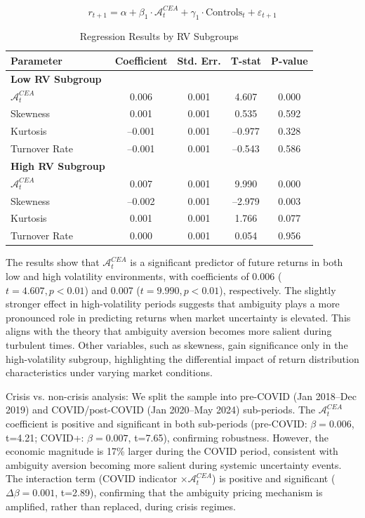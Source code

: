 \documentclass[preprint,12pt,authoryear]{elsarticle}
\renewcommand{\textcolor}[2]{\begingroup\color{#1}#2\endgroup}
\begin{document}
\begin{equation}
r_{t+1} = \alpha + \beta_1 \cdot \mathcal{A}^{CEA}_t + \gamma_1 \cdot \mathrm{Controls}_t + \varepsilon_{t+1}
\end{equation}

\begin{table}[h!]
\centering
\caption{Regression Results by RV Subgroups}
\label{tab:rv_subgroup_results}
\begin{tabularx}{\textwidth}{Xcccc}
\toprule
\textbf{Parameter} & \textbf{Coefficient} & \textbf{Std. Err.} & \textbf{T-stat} & \textbf{P-value} \\
\midrule
\textbf{Low RV Subgroup} & & & & \\
\(\mathcal{A}^{CEA}_t\) & 0.006 & 0.001 & 4.607 & 0.000 \\
Skewness & 0.001 & 0.001 & 0.535 & 0.592 \\
Kurtosis & –0.001 & 0.001 & –0.977 & 0.328 \\
Turnover Rate & –0.001 & 0.001 & –0.543 & 0.586 \\
\midrule
\textbf{High RV Subgroup} & & & & \\
\(\mathcal{A}^{CEA}_t\) & 0.007 & 0.001 & 9.990 & 0.000 \\
Skewness & –0.002 & 0.001 & –2.979 & 0.003 \\
Kurtosis & 0.001 & 0.001 & 1.766 & 0.077 \\
Turnover Rate & 0.000 & 0.001 & 0.054 & 0.956 \\
\bottomrule
\end{tabularx}
\end{table}

The results show that $\mathcal{A}^{CEA}_t$ is a significant predictor of future returns in both low and high volatility environments, with coefficients of 0.006 ($t = 4.607, p < 0.01$) and 0.007 ($t = 9.990, p < 0.01$), respectively. The slightly stronger effect in high-volatility periods suggests that ambiguity plays a more pronounced role in predicting returns when market uncertainty is elevated. This aligns with the theory that ambiguity aversion becomes more salient during turbulent times. Other variables, such as skewness, gain significance only in the high-volatility subgroup, highlighting the differential impact of return distribution characteristics under varying market conditions.

\textcolor{red}{Crisis vs. non-crisis analysis: We split the sample into pre-COVID (Jan 2018–Dec 2019) and COVID/post-COVID (Jan 2020–May 2024) sub-periods. The $\mathcal{A}^{CEA}_t$ coefficient is positive and significant in both sub-periods (pre-COVID: $\beta=0.006$, t=4.21; COVID+: $\beta=0.007$, t=7.65), confirming robustness. However, the economic magnitude is 17\% larger during the COVID period, consistent with ambiguity aversion becoming more salient during systemic uncertainty events. The interaction term (COVID indicator $\times \mathcal{A}^{CEA}_t$) is positive and significant ($\Delta\beta=0.001$, t=2.89), confirming that the ambiguity pricing mechanism is amplified, rather than replaced, during crisis regimes.}
\end{document}
